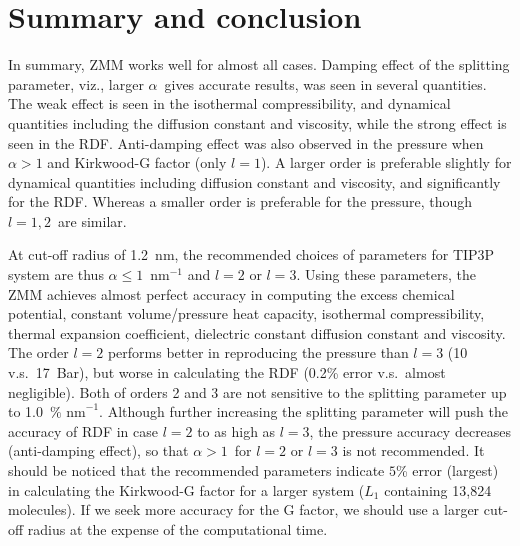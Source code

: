 \documentclass[a4paper,preprint,unsortedaddress,onecolumn,fleqn]{revtex4}
\begin{document}

\section{Summary and conclusion}

In summary, ZMM works well for almost all cases. Damping effect of the
splitting parameter, viz., larger $\alpha $\ gives accurate results, was
seen in several quantities. The weak effect is seen in the isothermal
compressibility, {\color{red} } and dynamical quantities including the
diffusion constant and viscosity, while the strong effect is seen in the
RDF. Anti-damping effect was also observed in the pressure when $\alpha >1$
and Kirkwood-G factor (only $l=1$). A larger order is preferable slightly
for dynamical quantities including diffusion constant and viscosity, and
significantly for the RDF. Whereas a smaller order is preferable for the
pressure, though $l=1,2$\ are similar.

At cut-off radius of 1.2~nm, the recommended choices of parameters for TIP3P
system are thus $\alpha \leq 1$~$\text{nm}^{-1}$ and $l=2$ or $l=3$. Using
these parameters, the ZMM  achieves almost perfect accuracy in
computing the excess chemical potential, constant volume/pressure heat
capacity, isothermal compressibility, thermal expansion coefficient,
dielectric constant diffusion constant and viscosity. The order $l=2$
performs better in reproducing the pressure than $l=3$ (10 v.s.~17~Bar), but
worse in calculating the RDF (0.2\% error v.s.~almost negligible). Both of
orders 2 and 3 are not sensitive to the splitting parameter up to 1.0~$\text{%
nm}^{-1}$. Although further increasing the splitting parameter will push the
accuracy of RDF in case $l=2 $ to as high as $l=3$, the pressure accuracy
decreases (anti-damping effect), so that $\alpha >1$\ for $l=2$ or $l=3$ is
not recommended. It should be noticed that the recommended parameters
indicate $5$\% error (largest) in calculating the Kirkwood-G factor for a
larger system ($L_{1}$ containing 13,824 molecules). If we seek more
accuracy for the G factor, we should use a larger cut-off radius at the
expense of the computational time. 
\end{document}
